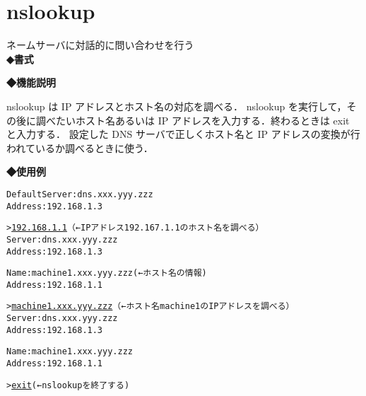 \section{nslookup}
ネームサーバに対話的に問い合わせを行う\\
\label{cmd:nslookup}
\noindent
{\bf ◆書式}
\begin{center}
\begin{screen}
\begin{alltt}
% nslookup
\end{alltt}
\end{screen}
\end{center}

\noindent
{\bf ◆機能説明}

nslookup は IP アドレスとホスト名の対応を調べる．
nslookup を実行して，その後に調べたいホスト名あるいは 
IP アドレスを入力する．終わるときは exit と入力する．
設定した DNS サーバで正しくホスト名と %
IP アドレスの変換が行われているか調べるときに使う．

\noindent
{\bf ◆使用例}
\begin{center}
\begin{breakbox}
\begin{alltt}
% \underline{nslookup}
Default Server:  dns.xxx.yyy.zzz
Address:  192.168.1.3

> \underline{192.168.1.1}  （←IPアドレス192.167.1.1のホスト名を調べる）
Server:  dns.xxx.yyy.zzz
Address:  192.168.1.3

Name:    machine1.xxx.yyy.zzz (←ホスト名の情報)
Address:  192.168.1.1

> \underline{machine1.xxx.yyy.zzz}  （←ホスト名machine1のIPアドレスを調べる）
Server:  dns.xxx.yyy.zzz
Address:  192.168.1.3

Name:    machine1.xxx.yyy.zzz
Address:  192.168.1.1

> \underline{exit}   (← nslookup を終了する)
%
\end{alltt}
\end{breakbox}
\end{center}
\clearpage

